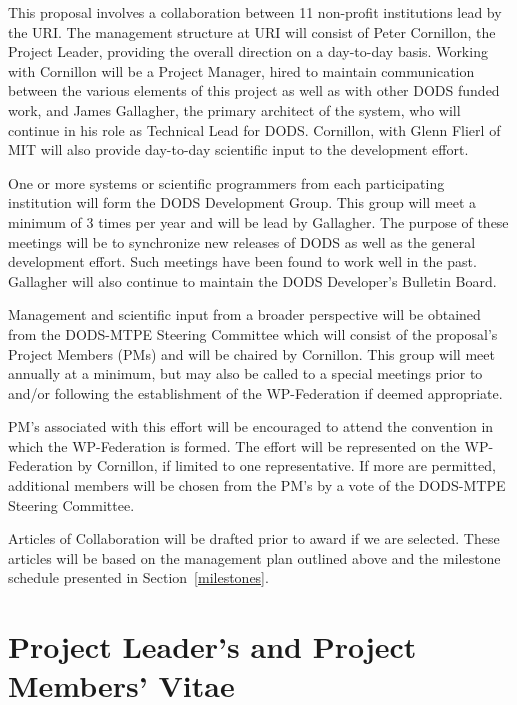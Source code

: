 \documentclass[12pt]{article}
\begin{document}
This proposal involves a collaboration between 11 non-profit
institutions lead by the \acl{URI}. The management structure
at \ac{URI} will consist of Peter Cornillon, the Project
Leader, providing the overall direction on a day-to-day basis.
Working with Cornillon will be a Project Manager, hired to 
maintain communication between the various elements of this 
project as well as with other \ac{DODS} funded work, and James 
Gallagher, the primary architect of the system, who will continue 
in his role as Technical Lead for \ac{DODS}. Cornillon, with 
Glenn Flierl of \ac{MIT} will also provide day-to-day scientific 
input to the development effort. 

One or more systems or scientific programmers from each participating
institution will form the \ac{DODS} Development Group. This group will
meet a minimum of 3 times per year and will be lead by Gallagher.
The purpose of these meetings will be to synchronize new releases
of \ac{DODS} as well as the general development effort. Such meetings 
have been found to work well in the past. Gallagher will also continue 
to maintain the \ac{DODS} Developer's Bulletin Board. 

Management and scientific input from a broader perspective will be 
obtained from the \ac{DODS}-\acs{MTPE} Steering Committee which will 
consist of the proposal's Project Members (\acs{PM}s) and will be chaired by 
Cornillon. This group will meet annually at a minimum, but may 
also be called to a special meetings prior to and/or following the 
establishment of the WP-Federation if deemed appropriate. 

\ac{PM}'s associated with this effort will be encouraged to attend the
convention in which the WP-Federation is formed. The effort will be 
represented on the WP-Federation by Cornillon, if limited to one
representative. If more are permitted, additional members will be
chosen from the \ac{PM}'s by a vote of the \ac{DODS}-\acs{MTPE} 
Steering Committee. 

Articles of Collaboration will be drafted prior to award if we are
selected. These articles will be based on the management plan outlined
above and the milestone schedule presented in Section~\ref{milestones}.

%
%

\section{Project Leader's and Project Members' Vitae}\label{vitae}
\bigskip
\end{document}
